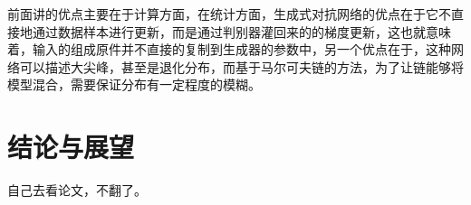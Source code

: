 \documentclass[UTF8]{ctexart}
\begin{document}
前面讲的优点主要在于计算方面，在统计方面，生成式对抗网络的优点在于它不直接地通过数据样本进行更新，而是通过判别器灌回来的的梯度更新，这也就意味着，输入的组成原件并不直接的复制到生成器的参数中，另一个优点在于，这种网络可以描述大尖峰，甚至是退化分布，而基于马尔可夫链的方法，为了让链能够将模型混合，需要保证分布有一定程度的模糊。




\section{结论与展望}
自己去看论文，不翻了。
\end{document}
